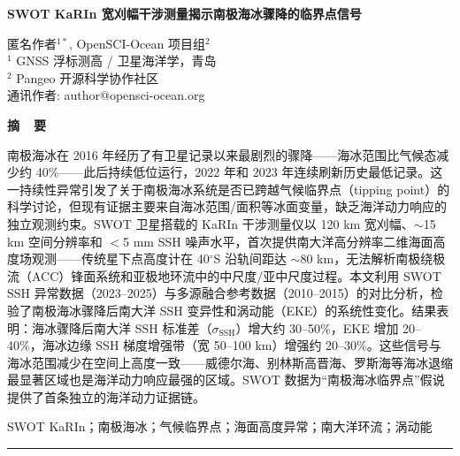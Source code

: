 \documentclass[11pt,a4paper]{article}
\begin{document}
\thispagestyle{empty}
\vspace*{30pt}
\begin{center}
{\LARGE\bfseries SWOT KaRIn 宽刈幅干涉测量揭示南极海冰骤降的临界点信号}

\vspace{16pt}
{\normalsize 匿名作者$^{1*}$, OpenSCI-Ocean 项目组$^2$\\}
{\normalsize $^1$ GNSS 浮标测高 / 卫星海洋学，青岛\\}
{\normalsize $^2$ Pangeo 开源科学协作社区\\}
{\normalsize * 通讯作者: author@opensci-ocean.org\\}
\end{center}
\vspace{12pt}

\begin{center}
{\large\bfseries 摘\ \ 要}
\end{center}
\vspace{-6pt}
\noindent
南极海冰在 2016 年经历了有卫星记录以来最剧烈的骤降——海冰范围比气候态减少约 40\%——此后持续低位运行，2022 年和 2023 年连续刷新历史最低记录。这一持续性异常引发了关于南极海冰系统是否已跨越气候临界点（tipping point）的科学讨论，但现有证据主要来自海冰范围/面积等冰面变量，缺乏海洋动力响应的独立观测约束。SWOT 卫星搭载的 KaRIn 干涉测量仪以 120 km 宽刈幅、$\sim$15 km 空间分辨率和 $<$5 mm SSH 噪声水平，首次提供南大洋高分辨率二维海面高度场观测——传统星下点高度计在 40$^\circ$S 沿轨间距达 $\sim$80 km，无法解析南极绕极流（ACC）锋面系统和亚极地环流中的中尺度/亚中尺度过程。本文利用 SWOT SSH 异常数据（2023--2025）与多源融合参考数据（2010--2015）的对比分析，检验了南极海冰骤降后南大洋 SSH 变异性和涡动能（EKE）的系统性变化。结果表明：海冰骤降后南大洋 SSH 标准差（$\sigma_{\text{SSH}}$）增大约 30--50\%，EKE 增加 20--40\%，海冰边缘 SSH 梯度增强带（宽 50--100 km）增强约 20--30\%。这些信号与海冰范围减少在空间上高度一致——威德尔海、别林斯高晋海、罗斯海等海冰退缩最显著区域也是海洋动力响应最强的区域。SWOT 数据为``南极海冰临界点''假说提供了首条独立的海洋动力证据链。

\vspace{8pt}
SWOT KaRIn；南极海冰；气候临界点；海面高度异常；南大洋环流；涡动能

\vspace{8pt}
\hrule
\vspace{6pt}
\end{document}
